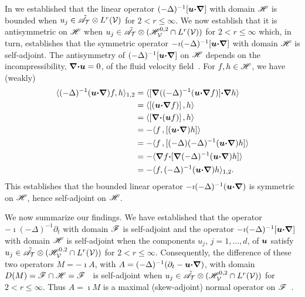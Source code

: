 \documentclass[amsa]{ipart}
\begin{document}
In  we established that the linear operator 
$(-\Delta)^{-1}[\boldsymbol{u}\mbox{\boldmath${\cdot}$}\mbox{\boldmath${\nabla}$}]$ with domain $\mathscr{H}$ is bounded when
$u_j\in\tilde{\mathscr{A}}_{\mathcal{T}}\otimes L^r(\mathcal{V})$ for $2<r\leq\infty$. We
now establish that it is antisymmetric on $\mathscr{H}$
when $u_j\in\tilde{\mathscr{A}}_{\mathcal{T}}\otimes(\mathscr{H}_{\mathcal{V}}^{0,2}\cap L^r(\mathcal{V}))$ for $2<r\leq\infty$
which, in turn, establishes that the symmetric operator
$-\imath(-\Delta)^{-1}[\boldsymbol{u}\mbox{\boldmath${\cdot}$}\mbox{\boldmath${\nabla}$}]$ with domain $\mathscr{H}$ is self-adjoint. The
antisymmetry of $(-\Delta)^{-1}[\boldsymbol{u}\mbox{\boldmath${\cdot}$}\mbox{\boldmath${\nabla}$}]$ on $\mathscr{H}$ 
depends on the incompressibility, $\mbox{\boldmath${\nabla}$}\mbox{\boldmath${\cdot}$}\boldsymbol{u}=0$, of the fluid
velocity field~\cite{Bhattacharya:AAP:1999:951}.  For $f,h\in\mathscr{H}$, we
have (weakly)    
%
\begin{align}\label{eq:Anti-sym_Sobolev}
 \langle(-\Delta)^{-1}(\vecu\bcdot\bnabla)f,h\rangle_{1,2}
       &=\langle[\bnabla((-\Delta)^{-1}(\vecu\bcdot\bnabla f)]\bcdot\bnabla h\rangle
       \\                              
       &=\langle[(\vecu\bcdot\bnabla f)]\,,h\rangle
       \notag\\
       &=\langle[\bnabla\bcdot(\vecu f)]\,,h\rangle
       \notag\\     
       &=-\langle f\,,[(\vecu\bcdot\bnabla)h]\rangle
       \notag\\
       &=-\langle f\,,[(-\Delta)(-\Delta)^{-1}(\vecu\bcdot\bnabla)h]\rangle
       \notag\\
       &=-\langle\bnabla f\bcdot[\bnabla(-\Delta)^{-1}(\vecu\bcdot\bnabla)h]\rangle
       \notag\\                              
       &= -\langle f,(-\Delta)^{-1}(\vecu\bcdot\bnabla)h\rangle_{1,2}.
       \notag
\end{align}
%
%
This establishes that the bounded linear operator
$-\imath(-\Delta)^{-1}(\boldsymbol{u}\mbox{\boldmath${\cdot}$}\mbox{\boldmath${\nabla}$})$ is symmetric on $\mathscr{H}$, hence
self-adjoint on $\mathscr{H}$.


We now summarize our findings. We have established that the
operator $-\imath(-\Delta)^{-1}\partial_t$ with domain $\mathscr{F}$ is self-adjoint and the
operator $-\imath(-\Delta)^{-1}[\boldsymbol{u}\mbox{\boldmath${\cdot}$}\mbox{\boldmath${\nabla}$}]$ with domain $\mathscr{H}$ is
self-adjoint when the components $u_j$, $j=1,\ldots,d$, of $\boldsymbol{u}$ satisfy
$u_j\in\tilde{\mathscr{A}}_{\mathcal{T}}\otimes (\mathscr{H}^{0,2}_{\mathcal{V}}\cap L^r(\mathcal{V}))$ for
$2<r\leq\infty$. Consequently, the difference of these two operators $M=-\imath A$,
with $A=(-\Delta)^{-1}(\partial_t-\boldsymbol{u}\mbox{\boldmath${\cdot}$}\mbox{\boldmath${\nabla}$})$, with domain
$D(M)=\mathscr{F}\cap\mathscr{H}=\mathscr{F}$~\cite{Stone:64} is self-adjoint when
$u_j\in\tilde{\mathscr{A}}_{\mathcal{T}}\otimes (\mathscr{H}^{0,2}_{\mathcal{V}}\cap L^r(\mathcal{V}))$ for $2<r\leq\infty$. Thus
$A=\imath M$ is a maximal (skew-adjoint) normal operator on
$\mathscr{F}$~\cite{Stone:64}.      
\end{document}
